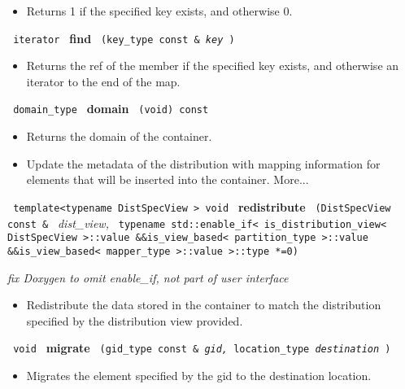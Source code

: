 \begin{itemize}
\item
Returns 1 if the specified key exists, and otherwise 0.
\end{itemize}
 
\noindent
\texttt{%
iterator 	
}
\textbf{find}%
\texttt{%
(key\_type const \&
\textit{key}%
)
}

\begin{itemize}
\item
Returns the ref of the member if the specified key exists, and otherwise an iterator to the end of the map. 
\end{itemize}
 
\noindent
\texttt{%
domain\_type 	
}
\textbf{domain}%
\texttt{%
(void) const
}

\begin{itemize}
\item
Returns the domain of the container.
\end{itemize}
 

\begin{itemize}
\item
Update the metadata of the distribution with mapping information for elements that will be inserted into the container. More...
\end{itemize}
 
\noindent
\texttt{%
template<typename DistSpecView >
void
}
\textbf{redistribute}%
\texttt{%
(DistSpecView const \&
}
\textit{dist\_view,}
\texttt{
typename std::enable\_if< is\_distribution\_view< DistSpecView >::value \&\&is\_view\_based< partition\_type >::value \&\&is\_view\_based< mapper\_type >::value >::type *=0)
}

\vspace{0.4cm} \emph{fix Doxygen to omit enable\_if, not part of user interface}

\begin{itemize}
\item
Redistribute the data stored in the container to match the distribution specified by the distribution view provided. 
\end{itemize}
 
\noindent
\texttt{%
void
}
\textbf{migrate}%
\texttt{%
(gid\_type const \&
\textit{gid,}
location\_type 
\textit{destination}
)
}

\begin{itemize}
\item
Migrates the element specified by the gid to the destination location. 
\end{itemize}
 
